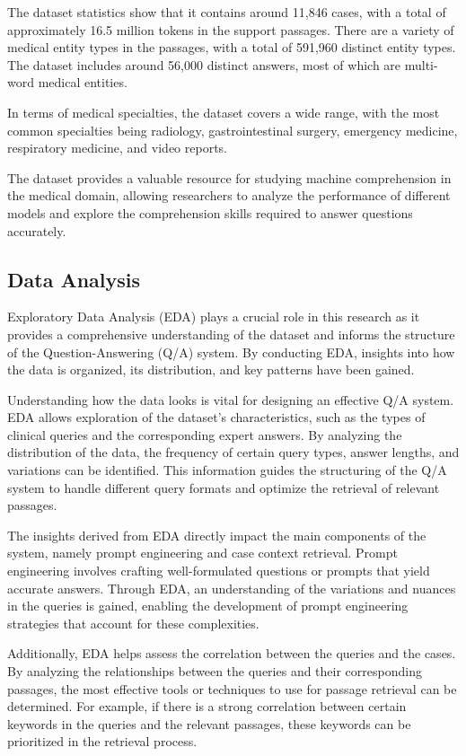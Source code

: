 \documentclass[onecolumn, conference]{IEEEtran}
\begin{document}
The dataset statistics show that it contains around 11,846 cases, with a total of approximately 16.5 million tokens in the support passages. There are a variety of medical entity types in the passages, with a total of 591,960 distinct entity types. The dataset includes around 56,000 distinct answers, most of which are multi-word medical entities.

In terms of medical specialties, the dataset covers a wide range, with the most common specialties being radiology, gastrointestinal surgery, emergency medicine, respiratory medicine, and video reports.

The dataset provides a valuable resource for studying machine comprehension in the medical domain, allowing researchers to analyze the performance of different models and explore the comprehension skills required to answer questions accurately.

\subsection{Data Analysis}
Exploratory Data Analysis (EDA) plays a crucial role in this research as it provides a comprehensive understanding of the dataset and informs the structure of the Question-Answering (Q/A) system. By conducting EDA, insights into how the data is organized, its distribution, and key patterns have been gained.

Understanding how the data looks is vital for designing an effective Q/A system. EDA allows exploration of the dataset's characteristics, such as the types of clinical queries and the corresponding expert answers. By analyzing the distribution of the data, the frequency of certain query types, answer lengths, and variations can be identified. This information guides the structuring of the Q/A system to handle different query formats and optimize the retrieval of relevant passages.

The insights derived from EDA directly impact the main components of the system, namely prompt engineering and case context retrieval. Prompt engineering involves crafting well-formulated questions or prompts that yield accurate answers. Through EDA, an understanding of the variations and nuances in the queries is gained, enabling the development of prompt engineering strategies that account for these complexities.

Additionally, EDA helps assess the correlation between the queries and the cases. By analyzing the relationships between the queries and their corresponding passages, the most effective tools or techniques to use for passage retrieval can be determined. For example, if there is a strong correlation between certain keywords in the queries and the relevant passages, these keywords can be prioritized in the retrieval process.
\end{document}
